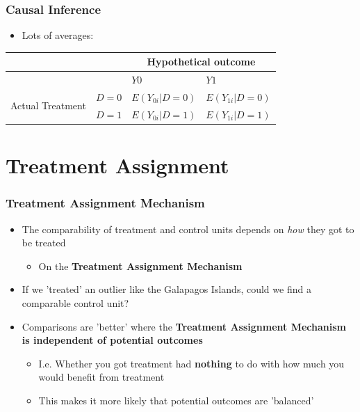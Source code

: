 \documentclass[xcolor=x11names,compress]{beamer}\usepackage[]{graphicx}\usepackage[]{color}
\renewcommand{\(}{\begin{columns}}
\renewcommand{\)}{\end{columns}}
\newcommand{\<}[1]{\begin{column}{#1}}
\renewcommand{\>}{\end{column}}
\begin{document}
\begin{frame}
\frametitle{Causal Inference}
\begin{itemize}
\item Lots of averages:
\end{itemize}
\begin{table}[htbp]
  \centering
    \begin{tabular}{|c|l|l|l|}
    \hline
          &       & \multicolumn{2}{c|}{Hypothetical outcome} \bigstrut\\
    \hline
          &       & $Y0$    & $Y1$ \bigstrut\\
    \hline
    \multirow{2}[4]{*}{Actual Treatment} & $D=0$   & \cellcolor{blue!25}$E(Y_{0i}|D=0)$ & $E(Y_{1i}|D=0)$ \bigstrut\\
\cline{2-4}          & $D=1$   & $E(Y_{0i}|D=1)$ & \cellcolor{blue!25}$E(Y_{1i}|D=1)$ \bigstrut\\
    \hline
    \end{tabular}%
  \label{tab:addlabel}%
\end{table}%
\end{frame}

\section{Treatment Assignment}

\begin{frame}
\frametitle{Treatment Assignment Mechanism}
\begin{itemize}
\item The comparability of treatment and control units depends on \textit{how} they got to be treated
\pause
\begin{itemize}
\item On the \textbf{Treatment Assignment Mechanism}
\pause
\end{itemize}
\item If we 'treated' an outlier like the Galapagos Islands, could we find a comparable control unit?
\pause
\item Comparisons are 'better' where the \textbf{Treatment Assignment Mechanism is independent of potential outcomes}
\pause
\begin{itemize}
\item I.e. Whether you got treatment had \textbf{nothing} to do with how much you would benefit from treatment 
\item This makes it more likely that potential outcomes are 'balanced'
\end{itemize}
\end{itemize}
\end{frame}
\end{document}
